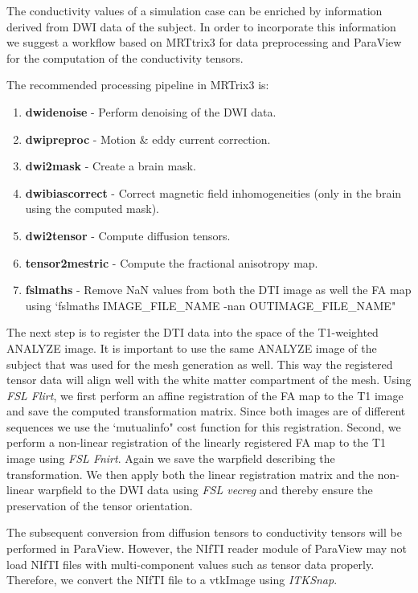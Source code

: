 The conductivity values of a simulation case can be enriched by information derived from DWI data of the subject.
In order to incorporate this information we suggest a workflow based on MRTtrix3 for data preprocessing and ParaView
for the computation of the conductivity tensors.\par
The recommended processing pipeline in MRTrix3 is:
\begin{enumerate}
    \item \textbf{dwidenoise} - Perform denoising of the DWI data.
    \item \textbf{dwipreproc} - Motion \& eddy current correction.
    \item \textbf{dwi2mask} - Create a brain mask.
    \item \textbf{dwibiascorrect} - Correct magnetic field inhomogeneities (only in the brain using the computed mask).
    \item \textbf{dwi2tensor} - Compute diffusion tensors.
    \item \textbf{tensor2mestric} - Compute the fractional anisotropy map. 
    \item \textbf{fslmaths} - Remove NaN values from both the DTI image as well the FA map using 
          `fslmaths IMAGE\_FILE\_NAME -nan OUTIMAGE\_FILE\_NAME"
\end{enumerate}
The next step is to register the DTI data into the space of the T1-weighted ANALYZE image. It is important to use the same
ANALYZE image of the subject that was used for the mesh generation as well. This way the registered tensor data will
align well with the white matter compartment of the mesh. Using \emph{FSL Flirt}, we first perform an affine
registration of the FA map to the T1 image and save the computed transformation matrix. Since both images are of different
sequences we use the `mutualinfo" cost function for this registration. Second, we perform a non-linear registration of the
linearly registered FA map to the T1 image using \emph{FSL Fnirt}. Again we save the warpfield describing the transformation.
We then apply both the linear registration matrix and the non-linear warpfield to the DWI data using \emph{FSL vecreg}
and thereby ensure the preservation of the tensor orientation.\par
The subsequent conversion from diffusion tensors to conductivity tensors will be performed in ParaView. However, the
NIfTI reader module of ParaView may not load NIfTI files with multi-component values such as tensor data properly. Therefore,
we convert the NIfTI file to a vtkImage using \emph{ITKSnap}.\par
